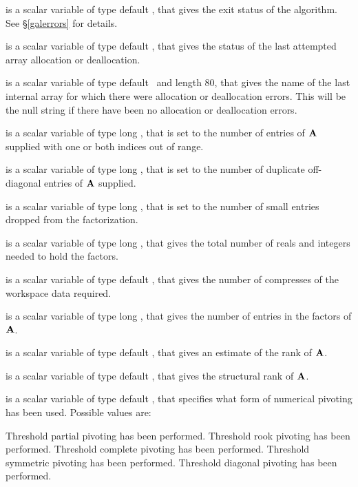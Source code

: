\documentclass{galahad}
\begin{document}
\begin{description}

 is a scalar variable of type default \integer, that gives the
exit status of the algorithm.
See \S\ref{galerrors}
for details.

 is a scalar variable of type default \integer, that gives
the status of the last attempted array allocation or deallocation.

 is a scalar variable of type default \character\
and length 80, that  gives the name of the last internal array
for which there were allocation or deallocation errors.
This will be the null string if there have been no
allocation or deallocation errors.


 is a scalar variable of type long \integer,
that is set to the number of
entries of ${\mathbf{A}}$ supplied with one or both indices out of range.

 is a scalar variable of type long \integer,
that is set to the number of duplicate off-diagonal entries of ${\mathbf{A}}$ supplied.

 is a scalar variable of type long \integer,
that is set to the number of small entries dropped from the factorization.

 is a scalar variable of type long \integer,
that gives the total number of reals and integers needed to hold the
factors.

 is a scalar variable of type default \integer,
that gives the number of compresses of the workspace data required.

 is a scalar variable of type long \integer,
that gives the number of entries in the factors of ${\mathbf{A}}$.

 is a scalar variable of type default \integer,
that gives an estimate of the rank of ${\mathbf{A}}$.

 is a scalar variable of type default \integer,
that gives the structural rank of ${\mathbf{A}}$.

 is a scalar variable of type default \integer,
that specifies what form of numerical pivoting has been used.
Possible values are:
\begin{description}
   Threshold partial pivoting has been performed.
   Threshold rook pivoting has been performed.
   Threshold complete pivoting has been performed.
   Threshold symmetric pivoting has been performed.
   Threshold diagonal pivoting has been performed.
\end{description}


\end{description}
\end{document}
